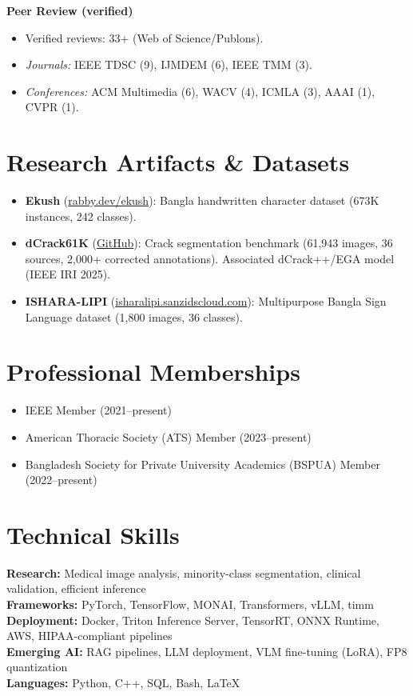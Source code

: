 \documentclass[11pt]{article}
\begin{document}
\textbf{Peer Review (verified)}
\begin{itemize}
  \item Verified reviews: 33+ (Web of Science/Publons).
  \item \textit{Journals:} IEEE TDSC (9), IJMDEM (6), IEEE TMM (3).
  \item \textit{Conferences:} ACM Multimedia (6), WACV (4), ICMLA (3), AAAI (1), CVPR (1).
\end{itemize}

\section{Research Artifacts \& Datasets}
\begin{itemize}
  \item \textbf{Ekush} (\href{https://rabby.dev/ekush}{rabby.dev/ekush}): Bangla handwritten character dataset (673K instances, 242 classes).
  \item \textbf{dCrack61K} (\href{https://github.com/shahariarrabby}{GitHub}): Crack segmentation benchmark (61,943 images, 36 sources, 2,000+ corrected annotations). Associated dCrack++/EGA model (IEEE IRI 2025).
  \item \textbf{ISHARA-LIPI} (\href{https://isharalipi.sanzidscloud.com}{isharalipi.sanzidscloud.com}): Multipurpose Bangla Sign Language dataset (1,800 images, 36 classes).
\end{itemize}

\section{Professional Memberships}
\begin{itemize}
  \item IEEE Member (2021--present)
  \item American Thoracic Society (ATS) Member (2023--present)
  \item Bangladesh Society for Private University Academics (BSPUA) Member (2022--present)
\end{itemize}

\section{Technical Skills}
\noindent\textbf{Research:} Medical image analysis, minority-class segmentation, clinical validation, efficient inference\\
\textbf{Frameworks:} PyTorch, TensorFlow, MONAI, Transformers, vLLM, timm\\
\textbf{Deployment:} Docker, Triton Inference Server, TensorRT, ONNX Runtime, AWS, HIPAA-compliant pipelines\\
\textbf{Emerging AI:} RAG pipelines, LLM deployment, VLM fine-tuning (LoRA), FP8 quantization\\
\textbf{Languages:} Python, C++, SQL, Bash, \LaTeX
\end{document}
